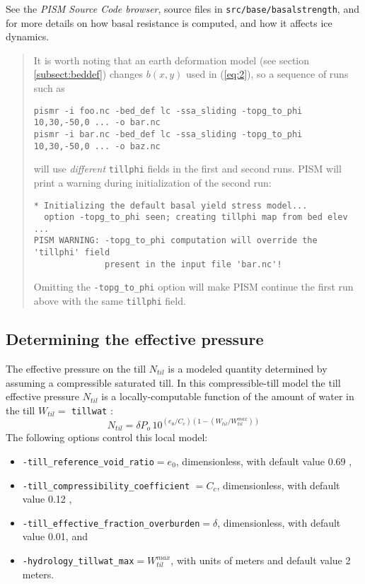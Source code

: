 See the \emph{PISM Source Code browser}, source files in \texttt{src/base/basalstrength}, and \cite{BBssasliding,BKAJS,Martinetal2011,Winkelmannetal2011} for more details on how basal resistance is computed, and how it affects ice dynamics.

\begin{quote}
  It is worth noting that an earth deformation model (see section
  \ref{subsect:beddef}) changes $b(x,y)$ used in (\ref{eq:2}), so a sequence of
  runs such as
\begin{verbatim}
pismr -i foo.nc -bed_def lc -ssa_sliding -topg_to_phi 10,30,-50,0 ... -o bar.nc
pismr -i bar.nc -bed_def lc -ssa_sliding -topg_to_phi 10,30,-50,0 ... -o baz.nc
\end{verbatim}
  will use \emph{different} \texttt{tillphi} fields in the first and second
  runs. PISM will print a warning during initialization of the second run:
\begin{verbatim}
* Initializing the default basal yield stress model...
  option -topg_to_phi seen; creating tillphi map from bed elev ...
PISM WARNING: -topg_to_phi computation will override the 'tillphi' field
              present in the input file 'bar.nc'!
\end{verbatim}
  Omitting the \texttt{-topg_to_phi} option will make PISM continue the first
  run above with the same \texttt{tillphi} field.
\end{quote}

\subsection*{Determining the effective pressure}  The effective pressure on the till $N_{til}$ is a modeled quantity determined by assuming a compressible saturated till.  In this compressible-till model the till effective pressure $N_{til}$ is a locally-computable function of the amount of water in the till $W_{til} =$ \texttt{tillwat} \cite{BuelervanPeltDRAFT}:
\begin{equation}
N_{til} = \delta P_o \, 10^{(e_0/C_c) \left(1 - (W_{til}/W_{til}^{max})\right)}  \label{eq:computeNtil}
\end{equation}
The following options control this local model:\begin{itemize}
\item \texttt{-till_reference_void_ratio}$= e_0$, dimensionless, with default value 0.69 \cite{Tulaczyketal2000b},
\item \texttt{-till_compressibility_coefficient} $= C_c$, dimensionless, with default value 0.12 \cite{Tulaczyketal2000b},
\item \texttt{-till_effective_fraction_overburden}$= \delta$, dimensionless, with default value 0.01, and
\item \texttt{-hydrology_tillwat_max}$= W_{til}^{max}$, with units of meters and default value 2 meters.
\end{itemize}

